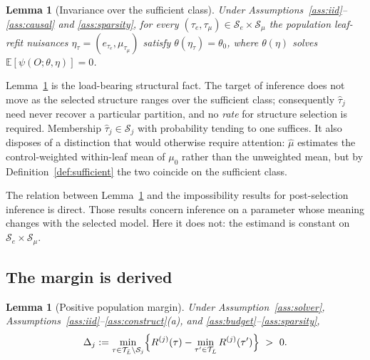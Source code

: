 \documentclass[11pt]{article}
\theoremstyle{plain}
\newtheorem{lemma}[theorem]{Lemma}
\theoremstyle{definition}
\theoremstyle{remark}
\newcommand{\E}{\mathbb{E}}
\newcommand{\cT}{\mathcal{T}}
\newcommand{\cS}{\mathcal{S}}
\newcommand{\mz}{\mu_0}
\newcommand{\mhat}{\widehat{\mu}}
\newcommand{\that}{\widehat{\tau}}
\begin{document}
\begin{lemma}[Invariance over the sufficient class]\label{lem:invariance}
Under Assumptions~\ref{ass:iid}--\ref{ass:causal} and
\ref{ass:sparsity}, for every $(\tau_e,\tau_\mu)\in\cS_e\times\cS_\mu$ the
population leaf-refit nuisances $\eta_\tau=(e_{\tau_e},\mu_{\tau_\mu})$ satisfy
$\theta(\eta_\tau)=\theta_0$, where $\theta(\eta)$ solves
$\E[\psi(O;\theta,\eta)]=0$.
\end{lemma}

Lemma~\ref{lem:invariance} is the load-bearing structural fact. The target of
inference does not move as the selected structure ranges over the sufficient
class; consequently $\that_j$ need never recover a particular partition, and no
\emph{rate} for structure selection is required. Membership $\that_j\in\cS_j$
with probability tending to one suffices. It also disposes of a distinction that
would otherwise require attention: $\mhat$ estimates the control-weighted
within-leaf mean of $\mz$ rather than the unweighted mean, but by
Definition~\ref{def:sufficient} the two coincide on the sufficient class.

The relation between Lemma~\ref{lem:invariance} and the impossibility results
for post-selection inference \citep{leeb2005} is direct. Those results concern
inference on a parameter whose meaning changes with the selected model. Here it
does not: the estimand is constant on $\cS_e\times\cS_\mu$.

\subsection{The margin is derived}

\begin{lemma}[Positive population margin]\label{lem:margin}
Under Assumption~\ref{ass:solver}, Assumptions~\ref{ass:iid}--\ref{ass:construct}(a),
and \ref{ass:budget}--\ref{ass:sparsity},
\[
  \Delta_j:=\min_{\tau\in\cT_{\bar L}\setminus\cS_j}
  \Bigl\{R^{(j)}(\tau)-\min_{\tau'\in\cT_{\bar L}}R^{(j)}(\tau')\Bigr\}
  \ >\ 0 .
\]
\end{lemma}
\end{document}
